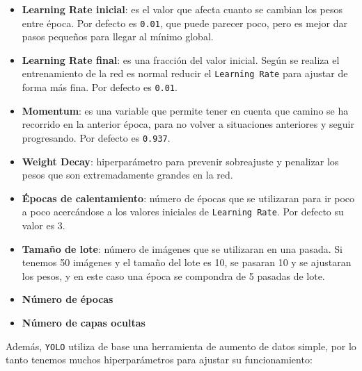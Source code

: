 \begin{itemize}
    \item \textbf{Learning Rate inicial}: es el valor que afecta cuanto se cambian los pesos entre época. Por defecto es \texttt{0.01}, que puede parecer poco, pero es mejor dar pasos pequeños para llegar al mínimo global.
    \item \textbf{Learning Rate final}: es una fracción del valor inicial. Según se realiza el entrenamiento de la red es normal reducir el \texttt{Learning Rate} para ajustar de forma más fina. Por defecto es \texttt{0.01}.
    \item \textbf{Momentum}: es una variable que permite tener en cuenta que camino se ha recorrido en la anterior época, para no volver a situaciones anteriores y seguir progresando. Por defecto es \texttt{0.937}.
    \item \textbf{Weight Decay}: hiperparámetro para prevenir sobreajuste y penalizar los pesos que son extremadamente grandes en la red.
    \item \textbf{Épocas de calentamiento}: número de épocas que se utilizaran para ir poco a poco acercándose a los valores iniciales de \texttt{Learning Rate}. Por defecto su valor es 3.
    \item \textbf{Tamaño de lote}: número de imágenes que se utilizaran en una pasada. Si tenemos 50 imágenes y el tamaño del lote es 10, se pasaran 10 y se ajustaran los pesos, y en este caso una época se compondra 
    de 5 pasadas de lote.
    \item \textbf{Número de épocas}
    \item \textbf{Número de capas ocultas}
\end{itemize}
\clearpage
Además, \texttt{YOLO} utiliza de base una herramienta de aumento de datos simple, por lo tanto tenemos muchos hiperparámetros para ajustar su funcionamiento:


